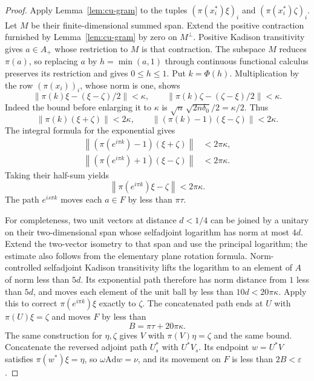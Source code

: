 \begin{proof}
Apply Lemma~\ref{lem:cu-gram} to the tuples $(\pi(x_i^*)\xi)_i$ and $(\pi(x_i^*)\zeta)_i$. Let $M$ be their finite-dimensional summed span.
Extend the positive contraction furnished by Lemma~\ref{lem:cu-gram} by zero on 
$M^\perp$. Positive Kadison transitivity \cite[Theorem II.6.1.13]{Blackadar2006} gives $a\in A_+$ whose restriction to $M$ is that contraction.
The subspace $M$ reduces $\pi(a)$, so replacing $a$ by $h=\min(a,1)$ through
continuous functional calculus preserves its restriction and gives $0\leq
h\leq1$. Put $k=\Phi(h)$. Multiplication by the row $(\pi(x_i))_i$, whose
norm is one, shows 
\begin{equation*}
\left\|\pi(k)\xi-(\xi-\zeta)/2\right\|<\kappa,\qquad
\left\|\pi(k)\zeta-(\zeta-\xi)/2\right\|<\kappa.
\end{equation*}
Indeed the bound before enlarging it to $\kappa$ is $\sqrt n\,\sqrt{2n\delta_0}/2=\kappa/2$. Thus 
\begin{equation*}
\left\|\pi(k)(\xi+\zeta)\right\|<2\kappa,\qquad
\left\|(\pi(k)-1)(\xi-\zeta)\right\|<2\kappa.
\end{equation*}
The integral formula for the exponential gives 
\begin{equation*}
\begin{split}
\left\|(\pi(e^{i\pi k})-1)(\xi+\zeta)\right\|&<2\pi\kappa, \\
\left\|(\pi(e^{i\pi k})+1)(\xi-\zeta)\right\|&<2\pi\kappa.
\end{split}\end{equation*}
Taking their half-sum yields 
\begin{equation*}
\left\|\pi(e^{i\pi k})\xi-\zeta\right\|<2\pi\kappa.
\end{equation*}
The path $e^{is\pi k}$ moves each $a\in F$ by less than $\pi\tau$.

For completeness, two unit vectors at distance $d<1/4$ can be joined by a
unitary on their two-dimensional span whose selfadjoint logarithm has norm
at most $4d$. Extend the two-vector isometry to that span and use the
principal logarithm; the estimate also follows from the elementary plane
rotation formula. Norm-controlled selfadjoint Kadison transitivity \cite[Theorem II.6.1.13]{Blackadar2006} lifts the logarithm to an element of $A$ of
norm less than $5d$. Its exponential path therefore has norm distance from $1 $ less than $5d$, and moves each element of the unit ball by less than $10d<20\pi\kappa$. Apply this to correct $\pi(e^{i\pi k})\xi$ exactly to $\zeta$. The concatenated path ends at $U$ with $\pi(U)\xi=\zeta$ and moves $F $ by less than 
\begin{equation*}
B=\pi\tau+20\pi\kappa.
\end{equation*}
The same construction for $\eta,\zeta$ gives $V$ with $\pi(V)\eta=\zeta$ and
the same bound. Concatenate the reversed adjoint path $U_s^*$ with $U^*V_s$.
Its endpoint $w=U^*V$ satisfies $\pi(w^*)\xi=\eta$, so $\omega\mathrm{Ad}
w=\nu $, and its movement on $F$ is less than $2B<\varepsilon$.


\end{proof}
